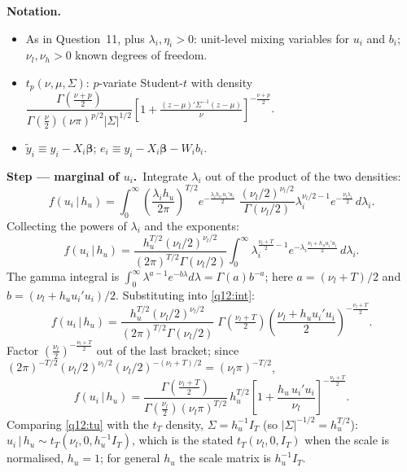 \documentclass[11pt,a4paper]{article}
\numberwithin{equation}{questao}
\newenvironment{notacao}{\par\smallskip\noindent\textbf{Notation.}\begin{itemize}[leftmargin=1.4em,topsep=1pt,itemsep=0pt]\small}{\end{itemize}}
\newcommand{\passo}[2]{\par\smallskip\noindent\textbf{Step --- #1.}~#2}
\begin{document}
\begin{sol}
\begin{notacao}
\item As in Question~11, plus $\lambda_i,\eta_i>0$: unit-level mixing variables for $u_i$ and $b_i$; $\nu_l,\nu_h>0$ known degrees of freedom.
\item $t_p(\nu,\mu,\Sigma)$: $p$-variate Student-$t$ with density $\dfrac{\Gamma(\frac{\nu+p}{2})}{\Gamma(\frac\nu2)(\nu\pi)^{p/2}|\Sigma|^{1/2}}\left[1+\frac{(z-\mu)'\Sigma^{-1}(z-\mu)}{\nu}\right]^{-\frac{\nu+p}{2}}$.
\item $\tilde y_i\equiv y_i-X_i\boldsymbol\beta$; $e_i\equiv y_i-X_i\boldsymbol\beta-W_ib_i$.
\end{notacao}

\passo{marginal of $u_i$}{Integrate $\lambda_i$ out of the product of the two densities:
\begin{equation*}
f(u_i\,|\,h_u)=\int_0^\infty\left(\frac{\lambda_ih_u}{2\pi}\right)^{T/2}e^{-\frac{\lambda_ih_u\,u_i'u_i}{2}}\;\frac{(\nu_l/2)^{\nu_l/2}}{\Gamma(\nu_l/2)}\lambda_i^{\nu_l/2-1}e^{-\frac{\nu_l\lambda_i}{2}}\,d\lambda_i .
\end{equation*}
Collecting the powers of $\lambda_i$ and the exponents:
\begin{equation}
f(u_i\,|\,h_u)=\frac{h_u^{T/2}(\nu_l/2)^{\nu_l/2}}{(2\pi)^{T/2}\Gamma(\nu_l/2)}\int_0^\infty\lambda_i^{\frac{\nu_l+T}{2}-1}e^{-\lambda_i\frac{\nu_l+h_uu_i'u_i}{2}}\,d\lambda_i . \label{q12:int}
\end{equation}
The gamma integral is $\int_0^\infty\lambda^{a-1}e^{-b\lambda}d\lambda=\Gamma(a)b^{-a}$; here $a=(\nu_l+T)/2$ and $b=(\nu_l+h_uu_i'u_i)/2$. Substituting into \eqref{q12:int}:
\begin{equation*}
f(u_i\,|\,h_u)=\frac{h_u^{T/2}(\nu_l/2)^{\nu_l/2}}{(2\pi)^{T/2}\Gamma(\nu_l/2)}\;\Gamma\!\left(\tfrac{\nu_l+T}{2}\right)\left(\frac{\nu_l+h_uu_i'u_i}{2}\right)^{-\frac{\nu_l+T}{2}}.
\end{equation*}
Factor $\left(\frac{\nu_l}{2}\right)^{-\frac{\nu_l+T}{2}}$ out of the last bracket; since $(2\pi)^{-T/2}(\nu_l/2)^{\nu_l/2}(\nu_l/2)^{-(\nu_l+T)/2}=(\nu_l\pi)^{-T/2}$,
\begin{equation}
f(u_i\,|\,h_u)=\frac{\Gamma(\frac{\nu_l+T}{2})}{\Gamma(\frac{\nu_l}{2})(\nu_l\pi)^{T/2}}\,h_u^{T/2}\left[1+\frac{h_u\,u_i'u_i}{\nu_l}\right]^{-\frac{\nu_l+T}{2}}. \label{q12:tu}
\end{equation}
Comparing \eqref{q12:tu} with the $t_T$ density, $\Sigma=h_u^{-1}I_T$ (so $|\Sigma|^{-1/2}=h_u^{T/2}$): $u_i\,|\,h_u\sim t_T(\nu_l,0,h_u^{-1}I_T)$, which is the stated $t_T(\nu_l,0,I_T)$ when the scale is normalised, $h_u=1$; for general $h_u$ the scale matrix is $h_u^{-1}I_T$.}


\end{sol}
\end{document}
